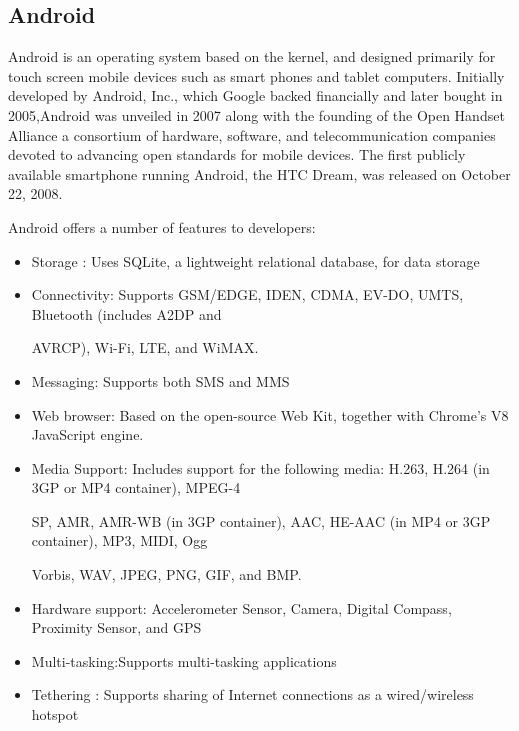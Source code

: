 \documentclass[12pt,a4paper,oneside]{report}
\begin{document}
\subsection{Android}
Android is an operating system based on the kernel, and designed primarily for touch screen mobile devices such as smart phones and tablet computers. Initially developed by Android, Inc., which Google backed financially and later bought in 2005,Android was unveiled in 2007 along with the founding of the Open Handset Alliance a consortium of hardware, software, and telecommunication companies devoted to advancing open standards for mobile devices. The first publicly available smartphone running Android, the HTC Dream, was released on October 22, 2008.
 
 
\par
Android offers a number of features to developers:
\begin{itemize}
\item Storage : Uses SQLite, a lightweight relational database, for data storage
\item Connectivity: Supports  GSM/EDGE,  IDEN,  CDMA,  EV-DO,  UMTS,  Bluetooth  (includes  A2DP  and

AVRCP), Wi-Fi, LTE, and WiMAX.
\item Messaging: Supports both SMS and MMS
\item Web browser: Based on the open-source Web Kit, together with Chrome’s V8 JavaScript engine.
\item Media Support: Includes support for the following media: H.263, H.264 (in 3GP or MP4 container), MPEG-4

SP, AMR, AMR-WB (in 3GP container), AAC, HE-AAC (in MP4 or 3GP container), MP3, MIDI, Ogg

Vorbis, WAV, JPEG, PNG, GIF, and BMP.
\item Hardware support: Accelerometer Sensor, Camera, Digital Compass, Proximity Sensor, and GPS
\item Multi-tasking:Supports multi-tasking applications
\item  Tethering : Supports sharing of Internet connections as a wired/wireless hotspot

\end{itemize}
\end{document}
